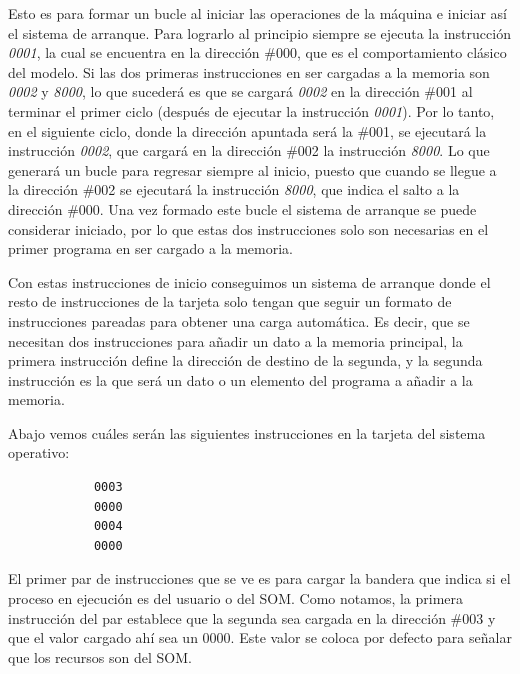 \documentclass[letterpaper,12pt,oneside]{book}
\begin{document}
		Esto es 
		para formar un bucle al iniciar las operaciones de la máquina
		e iniciar así el sistema de arranque. Para lograrlo al principio siempre se 
		ejecuta la instrucción \textit{0001}, la cual se encuentra en la 
		dirección \#000, que es el comportamiento clásico del modelo.
		Si las dos primeras instrucciones en ser cargadas a la memoria son \textit{0002} y \textit{8000},
		lo que sucederá es que se
		cargará \textit{0002} en la dirección \#001 al terminar el primer ciclo (después de ejecutar la instrucción \textit{0001}). Por lo tanto,
		en el siguiente ciclo, donde la dirección apuntada será la \#001, se ejecutará la instrucción \textit{0002}, 
		que cargará en la dirección \#002 la instrucción \textit{8000}.
		Lo que generará un bucle para regresar siempre al inicio, puesto que cuando se llegue a la dirección \#002 se ejecutará la instrucción
		\textit{8000}, que indica el salto a la dirección \#000. Una vez formado este bucle el sistema de arranque se puede considerar
		iniciado, por lo que estas dos instrucciones solo son necesarias en el primer programa en ser cargado a la memoria.
		
		Con estas instrucciones de inicio conseguimos un sistema de arranque donde el resto de instrucciones de la tarjeta solo tengan que 
		seguir
		un formato de instrucciones pareadas para obtener una carga automática. Es decir, que se necesitan dos instrucciones para añadir un dato a la 
		memoria principal, la primera 
		instrucción define la dirección de destino
		de la segunda, y la segunda instrucción es la que será un dato o un elemento del programa a añadir a la memoria. 
		
		Abajo vemos cuáles serán 
		las siguientes instrucciones en la tarjeta del sistema operativo:
		
		\begin{center}
		\begin{minipage}{0\textwidth}
			\begin{verbatim}
			0003
			0000
			0004
			0000
			\end{verbatim}	
		\end{minipage}
		\end{center}
		
		El primer par de instrucciones que se ve es para cargar la bandera que indica si el proceso en ejecución es del usuario o del SOM.
		Como notamos, la primera instrucción del par establece que la segunda sea cargada en la dirección \#003 y que el valor cargado ahí sea un 0000. 
		Este valor se coloca por defecto para señalar que los recursos son del SOM. 
		
\end{document}
